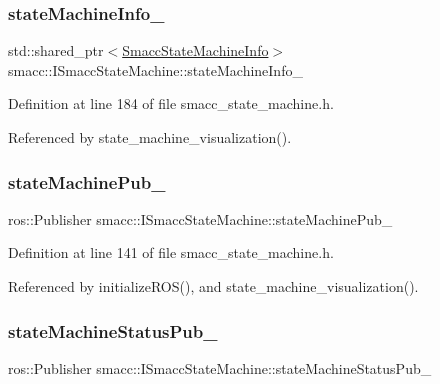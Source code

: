 \subsubsection{\texorpdfstring{state\+Machine\+Info\+\_\+}{stateMachineInfo\_}}
{\footnotesize\ttfamily std\+::shared\+\_\+ptr$<$\hyperlink{classsmacc_1_1introspection_1_1SmaccStateMachineInfo}{Smacc\+State\+Machine\+Info}$>$ smacc\+::\+I\+Smacc\+State\+Machine\+::state\+Machine\+Info\+\_\+\hspace{0.3cm}{\ttfamily [private]}}



Definition at line 184 of file smacc\+\_\+state\+\_\+machine.\+h.



Referenced by state\+\_\+machine\+\_\+visualization().

\mbox{\label{classsmacc_1_1ISmaccStateMachine_af4aa9fed70bd4c57b19e3370fbd25de7}} 
\subsubsection{\texorpdfstring{state\+Machine\+Pub\+\_\+}{stateMachinePub\_}}
{\footnotesize\ttfamily ros\+::\+Publisher smacc\+::\+I\+Smacc\+State\+Machine\+::state\+Machine\+Pub\+\_\+\hspace{0.3cm}{\ttfamily [protected]}}



Definition at line 141 of file smacc\+\_\+state\+\_\+machine.\+h.



Referenced by initialize\+R\+O\+S(), and state\+\_\+machine\+\_\+visualization().

\mbox{\label{classsmacc_1_1ISmaccStateMachine_a55a7c7b26ad4dfea441c62c6326a5414}} 
\subsubsection{\texorpdfstring{state\+Machine\+Status\+Pub\+\_\+}{stateMachineStatusPub\_}}
{\footnotesize\ttfamily ros\+::\+Publisher smacc\+::\+I\+Smacc\+State\+Machine\+::state\+Machine\+Status\+Pub\+\_\+\hspace{0.3cm}{\ttfamily [protected]}}



